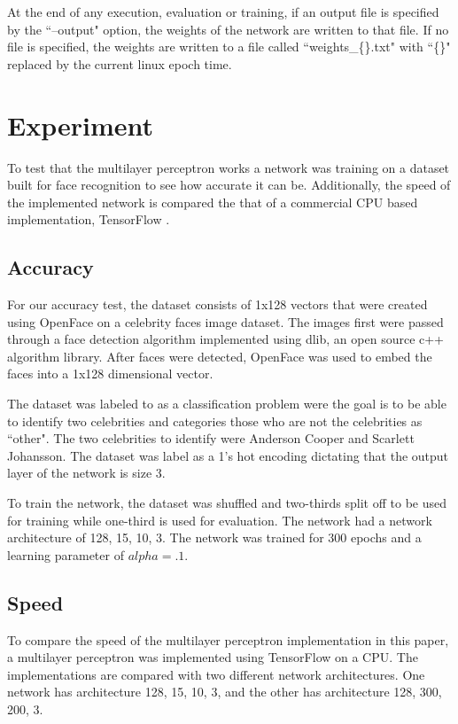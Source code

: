 \documentclass[jair, twoside,11pt,theapa]{article}
\begin{document}
At the end of any execution, evaluation or training, if an output file is specified by the ``--output" option, the weights of the network are written to that file. 
If no file is specified, the weights are written to a file called ``weights\_\{\}.txt" with ``\{\}" replaced by the current linux epoch time. 

\section{Experiment}
\label{Experiment}
To test that the multilayer perceptron works a network was training on a dataset built for face recognition to see how accurate it can be. 
Additionally, the speed of the implemented network is compared the that of a commercial CPU based implementation, TensorFlow \cite{tensorFlow}. 

\subsection{Accuracy}
For our accuracy test, the dataset consists of 1x128 vectors that were created using OpenFace \cite{openface} on a celebrity faces image dataset. 
The images first were passed through a face detection algorithm implemented using dlib, an open source c++ algorithm library. 
After faces were detected, OpenFace was used to embed the faces into a 1x128 dimensional vector. 

The dataset was labeled to as a classification problem were the goal is to be able to identify two celebrities and categories those who are not the celebrities as ``other".
The two celebrities to identify were Anderson Cooper and Scarlett Johansson. 
The dataset was label as a 1's hot encoding dictating that the output layer of the network is size 3. 

To train the network, the dataset was shuffled and two-thirds split off to be used for training while one-third is used for evaluation. 
The network had a network architecture of 128, 15, 10, 3. 
The network was trained for 300 epochs and a learning parameter of $alpha = .1$. 

\subsection{Speed}
To compare the speed of the multilayer perceptron implementation in this paper, a multilayer perceptron was implemented using TensorFlow on a CPU. 
The implementations are compared with two different network architectures. 
One network has architecture 128, 15, 10, 3, and the other has architecture 128, 300, 200, 3. 
\end{document}
